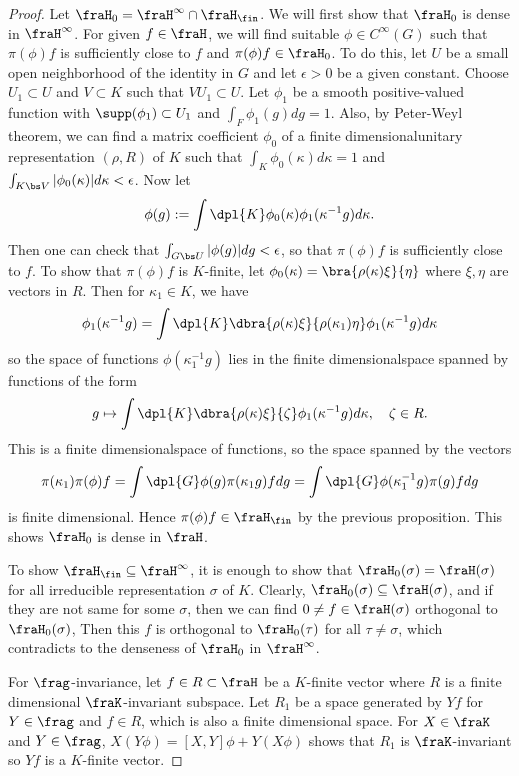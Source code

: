 \begin{proof}
Let $\fraH_{0} = \fraH^{\infty} \cap \fraH_{\fin}$. 
We will first show that $\fraH_{0}$ is dense in $\fraH^{\infty}$. 
For given $f\in \fraH$, we will find suitable $\phi \in C^{\infty}(G)$ such that $\pi(\phi)f$ is sufficiently close to $f$ and $\pi(\phi)f \in \fraH_{0}$. 
To do this, let $U$ be a small open neighborhood of the identity in $G$ and let $\epsilon >0$ be a given constant. 
Choose $U_{1} \subset U$ and $V\subset K$ such that $VU_{1} \subset U$. 
Let $\phi_1$ be a smooth positive-valued function with $\supp(\phi_1)\subset U_1$ and $\int_{F} \phi_{1}(g) dg = 1$. Also, by Peter-Weyl theorem, we can find a matrix coefficient $\phi_0$ of a finite dimensionalunitary representation $(\rho, R)$ of $K$ such that $\int_{K} \phi_0(\kappa)d\kappa = 1$ and $\int_{K\bs V} |\phi_{0}(\kappa)| d\kappa < \epsilon$. 
Now let
$$
\phi(g) := \int\dpl{K} \phi_{0}(\kappa) \phi_{1}(\kappa^{-1}g)d\kappa.
$$
Then one can check that $\int_{G\bs U} |\phi(g)|dg < \epsilon$, so that $\pi(\phi)f$ is sufficiently close to $f$. 
To show that $\pi(\phi)f$ is $K$-finite, let $\phi_{0}(\kappa) = \bra{\rho(\kappa)\xi}{\eta}$ where $\xi, \eta$ are vectors in $R$. 
Then for $\kappa_1\in K$, we have
\begin{align*}
\phi_{1}(\kappa^{-1}g) = \int\dpl{K} \dbra{\rho(\kappa)\xi}{\rho(\kappa_1)\eta} \phi_1(\kappa^{-1}g)d\kappa
\end{align*}
so the space of functions $\phi(\kappa_{1}^{-1}g)$ lies in the finite dimensionalspace spanned by functions of the form 
$$
g\mapsto \int\dpl{K} \dbra{\rho(\kappa)\xi}{\zeta} \phi_{1}(\kappa^{-1}g)d\kappa, \quad \zeta\in R.
$$
This is a finite dimensionalspace of functions, so the space spanned by the vectors 
$$
\pi(\kappa_1) \pi(\phi)f = \int\dpl{G}\phi(g)\pi(\kappa_{1}g)fdg = \int\dpl{G} \phi(\kappa_{1}^{-1}g)\pi(g)fdg
$$
is finite dimensional. Hence $\pi(\phi)f\in \fraH_{\fin}$ by the previous proposition. This shows $\fraH_0$ is dense in $\fraH$. 

To show $\fraH_\fin \subseteq \fraH^{\infty}$, it is enough to show that $\fraH_{0}(\sigma) = \fraH(\sigma)$ for all irreducible representation $\sigma$ of $K$. 
Clearly, $\fraH_{0}(\sigma) \subseteq \fraH(\sigma)$, and if they are not same for some $\sigma$, then we can find $0\neq f\in \fraH(\sigma)$ orthogonal to $\fraH_{0}(\sigma)$, 
Then this $f$ is orthogonal to $\fraH_{0}(\tau)$ for all $\tau \neq \sigma$, which contradicts to the denseness of $\fraH_{0}$ in $\fraH^{\infty}$. 

For $\frag$-invariance, let $f\in R\subset \fraH$ be a $K$-finite vector where $R$ is a finite dimensional  $\fraK$-invariant subspace. 
Let $R_{1}$ be a space generated by $Yf$ for $Y\in \frag$ and $f\in R$, which is also a finite dimensional space. For $X\in \fraK$ and $Y\in \frag$, $X(Y\phi) = [X, Y]\phi + Y(X\phi)$ shows that $R_{1}$ is $\fraK$-invariant so $Yf$ is a $K$-finite vector. 
\end{proof}
